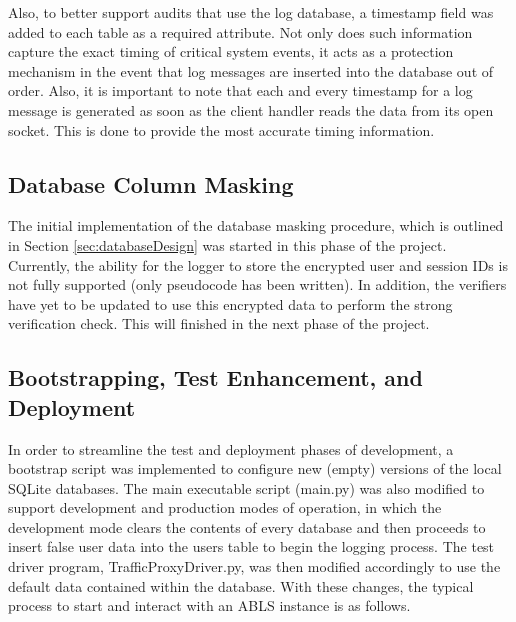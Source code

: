 \documentclass{sig-alternate}
\begin{document}
Also, to better support audits that use the log database, a timestamp field was added to each table as a required
attribute. Not only does such information capture the exact timing of critical system events, it acts as a protection
mechanism in the event that log messages are inserted into the database out of order. Also, it is important to note that
each and every timestamp for a log message is generated as soon as the client handler reads the data from
its open socket. This is done to provide the most accurate timing information.


\subsection{Database Column Masking}
The initial implementation of the database masking procedure, which is outlined in Section \ref{sec:databaseDesign}
was started in this phase of the project. Currently, the ability for the logger to store the encrypted user and session IDs 
is not fully supported (only pseudocode has been written). In addition, the verifiers have yet to be updated to use 
this encrypted data to perform the strong verification check. This will finished in the next phase of the project.

\subsection{Bootstrapping, Test Enhancement, and Deployment}
In order to streamline the test and deployment phases of development, a bootstrap script was implemented to configure
new (empty) versions of the local SQLite databases. The main executable script (main.py) was also modified to support
development and production modes of operation, in which the development mode clears the contents of every 
database and then proceeds to insert false user data into the users table to begin the logging process. The test 
driver program, TrafficProxyDriver.py, was then modified accordingly to use the default data contained within the 
database. With these changes, the typical process to start and interact with an ABLS instance is as follows.
\end{document}
